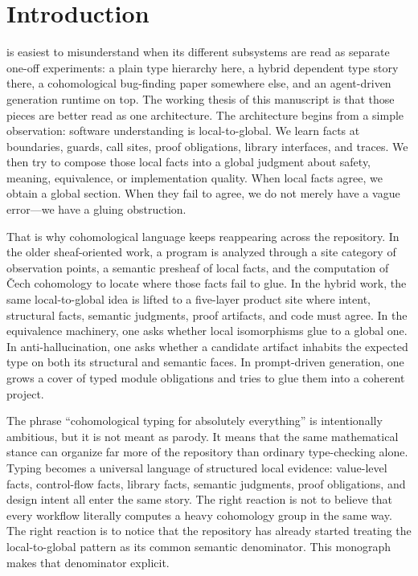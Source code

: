 \chapter{Introduction}

\DepPy{} is easiest to misunderstand when its different subsystems are read as separate
one-off experiments: a plain type hierarchy here, a hybrid dependent type story there, a
cohomological bug-finding paper somewhere else, and an agent-driven generation runtime on
top. The working thesis of this manuscript is that those pieces are better read as one
architecture. The architecture begins from a simple observation: software understanding is
local-to-global. We learn facts at boundaries, guards, call sites, proof obligations,
library interfaces, and traces. We then try to compose those local facts into a global
judgment about safety, meaning, equivalence, or implementation quality. When local facts
agree, we obtain a global section. When they fail to agree, we do not merely have a vague
error---we have a gluing obstruction.

That is why cohomological language keeps reappearing across the repository. In the older
sheaf-oriented work, a program is analyzed through a site category of observation points,
a semantic presheaf of local facts, and the computation of \v{C}ech cohomology to locate
where those facts fail to glue. In the hybrid work, the same local-to-global idea is
lifted to a five-layer product site where intent, structural facts, semantic judgments,
proof artifacts, and code must agree. In the equivalence machinery, one asks whether
local isomorphisms glue to a global one. In anti-hallucination, one asks whether a
candidate artifact inhabits the expected type on both its structural and semantic faces.
In prompt-driven generation, one grows a cover of typed module obligations and tries to
glue them into a coherent project.

The phrase ``cohomological typing for absolutely everything'' is intentionally ambitious,
but it is not meant as parody. It means that the same mathematical stance can organize
far more of the repository than ordinary type-checking alone. Typing becomes a universal
language of structured local evidence: value-level facts, control-flow facts, library
facts, semantic judgments, proof obligations, and design intent all enter the same story.
The right reaction is not to believe that every workflow literally computes a heavy
cohomology group in the same way. The right reaction is to notice that the repository has
already started treating the local-to-global pattern as its common semantic denominator.
This monograph makes that denominator explicit.

